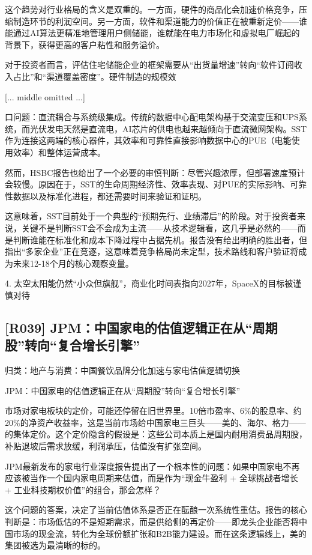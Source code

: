 \documentclass[11pt]{ctexart}
\begin{document}
这个趋势对行业格局的含义是双重的。一方面，硬件的商品化会加速价格竞争，压缩制造环节的利润空间。另一方面，软件和渠道能力的价值正在被重新定价——谁能通过AI算法更精准地管理用户侧储能，谁就能在电力市场化和虚拟电厂崛起的背景下，获得更高的客户粘性和服务溢价。

对于投资者而言，评估住宅储能企业的框架需要从“出货量增速”转向“软件订阅收入占比”和“渠道覆盖密度”。硬件制造的规模效

[... middle omitted ...]

口问题：直流耦合与系统级集成。传统的数据中心配电架构基于交流变压和UPS系统，而光伏发电天然是直流电，AI芯片的供电也越来越倾向于直流微网架构。SST作为连接这两端的核心器件，其效率和可靠性直接影响数据中心的PUE（电能使用效率）和整体运营成本。

然而，HSBC报告也给出了一个必要的审慎判断：尽管兴趣浓厚，但部署速度预计会较慢。原因在于，SST的生命周期经济性、效率表现、对PUE的实际影响、可靠性数据以及标准化进程，都还需要时间来验证和证明。

这意味着，SST目前处于一个典型的“预期先行、业绩滞后”的阶段。对于投资者来说，关键不是判断SST会不会成为主流——从技术逻辑看，这几乎是必然的——而是判断谁能在标准化和成本下降过程中占据先机。报告没有给出明确的胜出者，但指出“多家企业”正在竞逐，这意味着竞争格局尚未定型，技术路线和客户验证将成为未来12-18个月的核心观察变量。

4. 太空太阳能仍然“小众但旗舰”，商业化时间表指向2027年，SpaceX的目标被谨慎对待

\subsection{[R039] JPM：中国家电的估值逻辑正在从“周期股”转向“复合增长引擎”}
{\small\color{refgray}归类：地产与消费：中国餐饮品牌分化加速与家电估值逻辑切换}

JPM：中国家电的估值逻辑正在从“周期股”转向“复合增长引擎”

市场对家电板块的定价，可能还停留在旧世界里。10倍市盈率、6\%的股息率、约20\%的净资产收益率，这是当前市场给中国家电三巨头——美的、海尔、格力——的集体定价。这个定价隐含的假设是：这些公司本质上是国内耐用消费品周期股，补贴退坡后需求放缓，利润承压，估值没有扩张空间。

JPM最新发布的家电行业深度报告提出了一个根本性的问题：如果中国家电不再应该被当作一个国内家电周期来估值，而是作为“现金牛盈利 + 全球挑战者增长 + 工业科技期权价值”的组合，那会怎样？

这个问题的答案，决定了当前估值体系是否正在酝酿一次系统性重估。报告的核心判断是：市场低估的不是短期需求，而是供给侧的再定价——即龙头企业能否将中国市场的现金流，转化为全球份额扩张和B2B能力建设。而在这条逻辑线上，美的集团被选为最清晰的标的。
\end{document}
